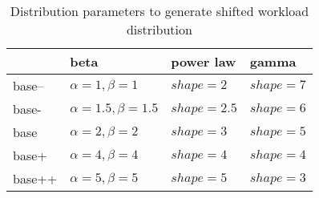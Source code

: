 \begin{table}[]
\centering
\caption{Distribution parameters to generate shifted workload distribution}
\label{tab:distribution_parameters}
\begin{tabular}{llll}
\toprule
       & beta & power law & gamma \\
\midrule
base-- & $\alpha=1, \beta=1$		&  $shape=2$         &   $shape=7$    \\
base-  & $\alpha=1.5, \beta=1.5$    &  $shape=2.5$       &   $shape=6$    \\
base   & $\alpha=2, \beta=2$     	&  $shape=3$         &   $shape=5$    \\
base+  & $\alpha=4, \beta=4$     	&  $shape=4$         &   $shape=4$    \\
base++ & $\alpha=5, \beta=5$     	&  $shape=5$         &   $shape=3$	  \\
\bottomrule  
\end{tabular}
\end{table}